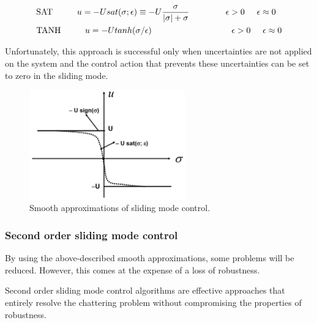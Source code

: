 \documentclass{thesisreport}
\begin{document}
\begin{equation}
\begin{aligned}
&\text{SAT} \text{\hspace{1cm}} u=-U sat(\sigma; \epsilon) \equiv -U \frac{\sigma}{|\sigma| + \sigma} \text{\hspace{1.5cm}} \epsilon >0 \text{\hspace{0.5cm}} \epsilon \approx 0 \\
&\text{TANH} \text{\hspace{1cm}} u=-U tanh(\sigma/ \epsilon)  \text{\hspace{3.3cm}} \epsilon >0 \text{\hspace{0.5cm}} \epsilon \approx 0  \\
\end{aligned}
\end{equation}

Unfortunately, this approach is successful only when uncertainties are not applied on the system and the control action that prevents these uncertainties can be set to zero in the sliding mode.


\begin{figure}[h]
\centering
\includegraphics[width=0.6\textwidth]{Images/Control/first_order_sliding_mode_control_c}
\caption{Smooth approximations of sliding mode control. \cite{DeCarlo2008}}
\label{Smooth_Sliding_mode_control}
\end{figure}

\subsubsection{Second order sliding mode control}


By using the above-described smooth approximations, some problems will be reduced. However, this comes at the expense of a loss of robustness.


Second order sliding mode control algorithms are effective approaches that entirely resolve the chattering problem without compromising the properties of robustness.
\end{document}

